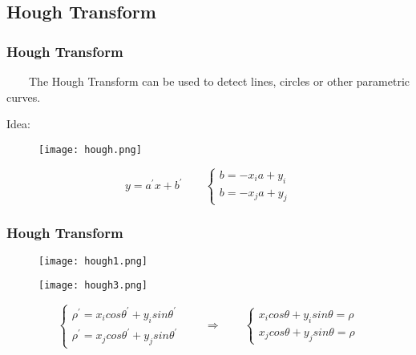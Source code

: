 \documentclass[notheorems,serif,table,compress]{beamer}  %
\begin{document}
\subsection{Hough Transform}
\begin{frame}
\frametitle{Hough Transform}
~~~~The Hough Transform can be used to detect lines, circles or other parametric curves.\newline

{\color{blue}Idea:}
    \begin{figure}
    \texttt{[image: hough.png]} 
    \end{figure}
    \begin{displaymath}
    y=a^{'}x+b^{'}
    \qquad
    \left\{ \begin{array}{c}
    b = -x_{i}a+y_{i}\\
    b = -x_{j}a+y_{j}
    \end{array} \right.
    \end{displaymath}
\end{frame}

\begin{frame}
\frametitle{Hough Transform}
    \begin{figure}
    \begin{minipage}[t]{0.4\linewidth}
    \texttt{[image: hough1.png]} 
    \end{minipage}
    \qquad 
    \qquad
    \quad
    \begin{minipage}[t]{0.4\linewidth}
    \texttt{[image: hough3.png]} 
    \end{minipage}
    \end{figure}
    \begin{displaymath}
    \left\{ \begin{array}{c}
    \rho^{'}=x_{i}cos\theta^{'} + y_{i}sin\theta^{'}\\
    \rho^{'}=x_{j}cos\theta^{'} + y_{j}sin\theta^{'}
    \end{array} \right.
     \qquad \Longrightarrow \qquad
    \left\{ \begin{array}{c}
    x_{i}cos\theta + y_{i}sin\theta= \rho\\
    x_{j}cos\theta + y_{j}sin\theta= \rho
    \end{array} \right.
    \end{displaymath}
\end{frame}
\end{document}
